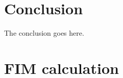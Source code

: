 \documentclass[journal]{IEEEtran}
\begin{document}




\section{Conclusion}
\label{sec_conclusions}
The conclusion goes here.






%


\appendices
\section{FIM calculation}
\label{apdx_clacFim}

% 
\end{document}
